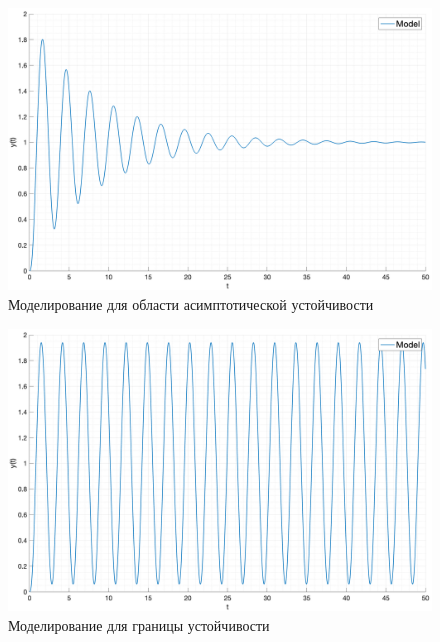 \begin{figure}[ht!]
    \centering
    \includegraphics[width=\textwidth]{media/case7.png}
    \caption{Моделирование для области асимптотической устойчивости}
    \label{fig:case7}
\end{figure}

\begin{figure}[ht!]
    \centering
    \includegraphics[width=\textwidth]{media/case8.png}
    \caption{Моделирование для границы устойчивости}
    \label{fig:case8}
\end{figure}

